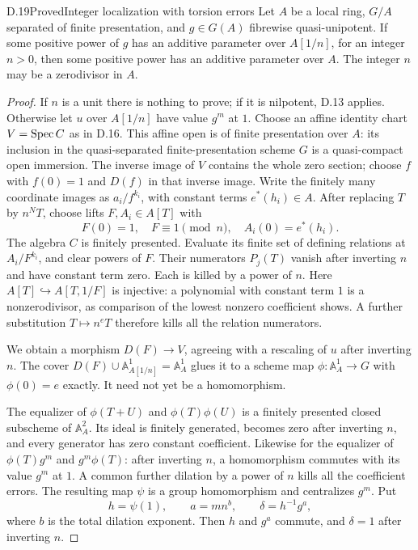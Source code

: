 \begin{statement}{D.19}{Proved}{Integer localization with torsion errors}
Let $A$ be a local ring, $G/A$ separated of finite
presentation, and $g\in G(A)$ fibrewise quasi-unipotent.
If some positive power of $g$ has an additive parameter over
$A[1/n]$, for an integer $n>0$, then some positive power has
an additive parameter over $A$. The integer $n$ may be a
zerodivisor in $A$.
\end{statement}
\begin{proof}
If $n$ is a unit there is nothing to prove; if it is nilpotent,
D.13 applies. Otherwise let $u$ over $A[1/n]$ have value
$g^m$ at $1$. Choose an affine identity chart $V=\operatorname{Spec} C$
as in D.16. This affine open is of finite presentation over $A$:
its inclusion in the quasi-separated finite-presentation scheme
$G$ is a quasi-compact open immersion. The inverse image of $V$ contains the whole zero
section; choose $f$ with $f(0)=1$ and $D(f)$ in that inverse
image. Write the finitely many coordinate images as
$a_i/f^{k_i}$, with constant terms $e^*(h_i)\in A$.
After replacing $T$ by $n^N T$, choose lifts
$F,A_i\in A[T]$ with
\[
          F(0)=1,\quad F\equiv1\pmod n,\quad
          A_i(0)=e^*(h_i).
\]
The algebra $C$ is finitely presented. Evaluate its finite set
of defining relations at $A_i/F^{k_i}$, and clear powers of
$F$. Their numerators $P_j(T)$ vanish after inverting $n$
and have constant term zero. Each is killed by a power of $n$.
Here $A[T]\hookrightarrow A[T,1/F]$ is injective: a polynomial
with constant term $1$ is a nonzerodivisor, as comparison of
the lowest nonzero coefficient shows. A further substitution
$T\mapsto n^eT$ therefore kills all the relation numerators.

We obtain a morphism $D(F)\to V$, agreeing with a rescaling of
$u$ after inverting $n$. The cover
$D(F)\cup\mathbb A^1_{A[1/n]}=\mathbb A^1_A$ glues it
to a scheme map $\phi:\mathbb A^1_A\to G$ with
$\phi(0)=e$ exactly. It need not yet be a homomorphism.

The equalizer of $\phi(T+U)$ and $\phi(T)\phi(U)$ is a
finitely presented closed subscheme of $\mathbb A^2_A$.
Its ideal is finitely generated, becomes zero after inverting
$n$, and every generator has zero constant coefficient.
Likewise for the equalizer of $\phi(T)g^m$ and $g^m\phi(T)$:
after inverting $n$, a homomorphism commutes with its value
$g^m$ at $1$. A common further dilation by a power of $n$
kills all the coefficient errors. The resulting map $\psi$
is a group homomorphism and centralizes $g^m$. Put
\[
                  h=\psi(1),\qquad
                  a=mn^b,\qquad\delta=h^{-1}g^a,
\]
where $b$ is the total dilation exponent. Then $h$ and $g^a$
commute, and $\delta=1$ after inverting $n$.


\end{proof}
